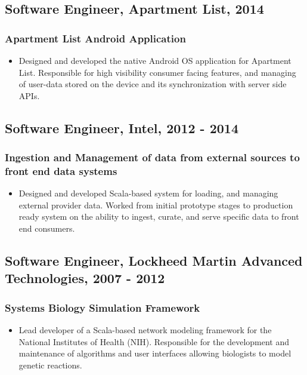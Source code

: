 \documentclass[11pt]{article}
\begin{document}
\subsection*{Software Engineer, Apartment List, 2014}
\label{sec-1-3}
\subsubsection*{Apartment List Android Application}
\label{sec-1-3-1}

\begin{itemize}
\item Designed and developed the native Android OS application for Apartment List. Responsible for high visibility consumer facing features, and managing of user-data stored on the device and its synchronization with server side APIs.
\end{itemize}
\subsection*{Software Engineer, Intel, 2012 - 2014}
\label{sec-1-4}
\subsubsection*{Ingestion and Management of data from external sources to front end data systems}
\label{sec-1-4-1}

\begin{itemize}
\item Designed and developed Scala-based system for loading, and managing external provider data. Worked from initial prototype stages to production ready system on the ability to ingest, curate, and serve specific data to front end consumers.
\end{itemize}

\pagebreak

\subsection*{Software Engineer, Lockheed Martin Advanced Technologies, 2007 - 2012}
\label{sec-1-5}
\subsubsection*{Systems Biology Simulation Framework}
\label{sec-1-5-1}

\begin{itemize}
\item Lead developer of a Scala-based network modeling framework for the National Institutes of Health (NIH). Responsible for the development and maintenance of algorithms and user interfaces allowing biologists to model genetic reactions.
\end{itemize}
\end{document}
